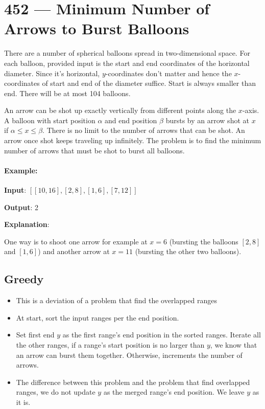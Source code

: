 \section{452 --- Minimum Number of Arrows to Burst Balloons}
There are a number of spherical balloons spread in two-dimensional space. For each balloon, provided input is the start and end coordinates of the horizontal diameter. Since it's horizontal, $y$-coordinates don't matter and hence the $x$-coordinates of start and end of the diameter suffice. Start is always smaller than end. There will be at most 104 balloons.

An arrow can be shot up exactly vertically from different points along the $x$-axis. A balloon with start position $\alpha$ and end position $\beta$ bursts by an arrow shot at $x$ if $\alpha \leq x\leq \beta$. There is no limit to the number of arrows that can be shot. An arrow once shot keeps traveling up infinitely. The problem is to find the minimum number of arrows that must be shot to burst all balloons.

\paragraph{Example:}

\begin{flushleft}
\textbf{Input}: $[[10,16], [2,8], [1,6], [7,12]]$

\textbf{Output}: 2

\textbf{Explanation}:

One way is to shoot one arrow for example at $x = 6$ (bursting the balloons $[2,8]$ and $[1,6]$) and another arrow at $x = 11$ (bursting the other two balloons).

\end{flushleft}

\subsection{Greedy}
\begin{itemize}
\item This is a deviation of a problem that find the overlapped ranges
\item At start, sort the input ranges per the end position.
\item Set first end $y$ as the first range's end position in the sorted ranges. Iterate all the other ranges, if a range's start position is no larger than $y$, we know that an arrow can burst them together. Otherwise, increments the number of arrows.
\item The difference between this problem and the problem that find overlapped ranges, we do not update $y$ as the merged range's end position. We leave $y$ as it is. 
\end{itemize}

